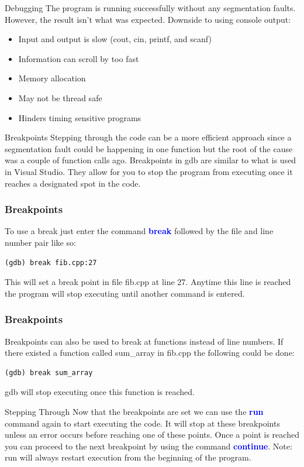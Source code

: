 \documentclass[11pt]{beamer}
\begin{document}
\begin{frame}{Debugging}
The program is running successfully without any segmentation faults. However, the result isn't what was expected.
\break
\break
Downside to using console output:
\begin{itemize}
\item Input and output is slow (cout, cin, printf, and scanf)
\item Information can scroll by too fast
\item Memory allocation
\item May not be thread safe
\item Hinders timing sensitive programs
\end{itemize}
\end{frame}
\begin{frame}{Breakpoints}
Stepping through the code can be a more efficient approach since a segmentation fault could be happening in one function but the root of the cause was a couple of function calls ago.
\break
\break
Breakpoints in gdb are similar to what is used in Visual Studio. They allow for you to stop the program from executing once it reaches a designated spot in the code.
\end{frame}

\begin{frame}[fragile]
\frametitle{Breakpoints}
To use a break just enter the command \textbf{\textcolor{blue}{break}} followed by the file and line number pair like so:
\begin{lstlisting}[style=BashInputStyle]
(gdb) break fib.cpp:27
\end{lstlisting}
This will set a break point in file fib.cpp at line 27. Anytime this line is reached the program will stop executing until another command is entered. 
\end{frame}

\begin{frame}[fragile]
\frametitle{Breakpoints}
Breakpoints can also be used to break at functions instead of line numbers. If there existed a function called sum\_array in fib.cpp the following could be done:
\begin{lstlisting}[style=BashInputStyle]
(gdb) break sum_array
\end{lstlisting}
gdb will stop executing once this function is reached.
\end{frame}

\begin{frame}{Stepping Through}
Now that the breakpoints are set we can use the \textbf{\textcolor{blue}{run}} command again to start executing the code. It will stop at these breakpoints unless an error occurs before reaching one of these points. 
\break
\break
Once a point is reached you can proceed to the next breakpoint by using the command \textbf{\textcolor{blue}{continue}}. 
\break
\break
Note: run will always restart execution from the beginning of the program.
\end{frame}
\end{document}

